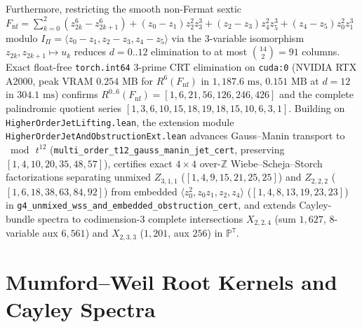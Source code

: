 \documentclass[11pt,a4paper]{article}
\begin{document}
Furthermore, restricting the smooth non-Fermat sextic $F_{\mathrm{nf}} = \sum_{k=0}^2 (z_{2k}^6 - z_{2k+1}^6) + (z_0{-}z_1) z_2^2 z_3^3 + (z_2{-}z_3) z_4^2 z_5^3 + (z_4{-}z_5) z_0^2 z_1^3$ modulo $I_\Pi = \langle z_0{-}z_1,\allowbreak z_2{-}z_3,\allowbreak z_4{-}z_5 \rangle$ via the $3$-variable isomorphism $z_{2k}, z_{2k+1} \mapsto u_k$ reduces $d = 0..12$ elimination to at most $\binom{14}{2} = 91$ columns. Exact float-free \texttt{torch.int64} $3$-prime CRT elimination on \texttt{cuda:0} (NVIDIA RTX A2000, peak VRAM $0.254\text{ MB}$ for $R^6(F_{\mathrm{nf}})$ in $1{,}187.6\text{ ms}$, $0.151\text{ MB}$ at $d = 12$ in $304.1\text{ ms}$) confirms $R^{0..6}(F_{\mathrm{nf}}) = [1,\allowbreak 6,\allowbreak 21,\allowbreak 56,\allowbreak 126,\allowbreak 246,\allowbreak 426]$ and the complete palindromic quotient series $[1,\allowbreak 3,\allowbreak 6,\allowbreak 10,\allowbreak 15,\allowbreak 18,\allowbreak 19,\allowbreak 18,\allowbreak 15,\allowbreak 10,\allowbreak 6,\allowbreak 3,\allowbreak 1]$. Building on \texttt{Higher\allowbreak{}Order\allowbreak{}Jet\allowbreak{}Lifting.lean}, the extension module \texttt{Higher\allowbreak{}Order\allowbreak{}Jet\allowbreak{}And\allowbreak{}Obstruction\allowbreak{}Ext.lean} advances Gauss--Manin transport to $\bmod\, t^{12}$ (\texttt{multi\_\allowbreak{}order\_\allowbreak{}t12\_\allowbreak{}gauss\_\allowbreak{}manin\_\allowbreak{}jet\_\allowbreak{}cert}, preserving $[1,\allowbreak 4,\allowbreak 10,\allowbreak 20,\allowbreak 35,\allowbreak 48,\allowbreak 57]$), certifies exact $4\times 4$ over-$\mathbb{Z}$ Wiebe--Scheja--Storch factorizations separating unmixed $Z_{3,1,1}$ ($[1,\allowbreak 4,\allowbreak 9,\allowbreak 15,\allowbreak 21,\allowbreak 25,\allowbreak 25]$) and $Z_{2,2,2}$ ($[1,\allowbreak 6,\allowbreak 18,\allowbreak 38,\allowbreak 63,\allowbreak 84,\allowbreak 92]$) from embedded $\langle z_0^2, z_0 z_1, z_2, z_4\rangle$ ($[1,\allowbreak 4,\allowbreak 8,\allowbreak 13,\allowbreak 19,\allowbreak 23,\allowbreak 23]$) in \texttt{g4\_\allowbreak{}unmixed\_\allowbreak{}wss\_\allowbreak{}and\_\allowbreak{}embedded\_\allowbreak{}obstruction\_\allowbreak{}cert}, and extends Cayley-bundle spectra to codimension-$3$ complete intersections $X_{2,2,4}$ (sum $1{,}627$, $8$-variable aux $6{,}561$) and $X_{2,3,3}$ ($1{,}201$, aux $256$) in $\mathbb{P}^7$.

\section{Mumford--Weil Root Kernels and Cayley Spectra}
\end{document}
